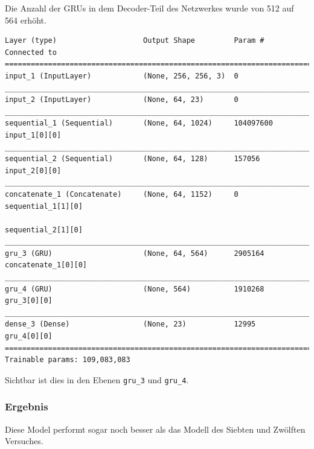 \documentclass[pdftex,a4paper,halfparskip, article]{scrartcl}
\begin{document}
Die Anzahl der GRUs in dem Decoder-Teil des Netzwerkes wurde von 512 auf 564 erhöht. 

\begin{verbatim}
Layer (type)                    Output Shape         Param #     Connected to
=============================================================================
input_1 (InputLayer)            (None, 256, 256, 3)  0
_____________________________________________________________________________
input_2 (InputLayer)            (None, 64, 23)       0
_____________________________________________________________________________
sequential_1 (Sequential)       (None, 64, 1024)     104097600   input_1[0][0]
_____________________________________________________________________________
sequential_2 (Sequential)       (None, 64, 128)      157056      input_2[0][0]
_____________________________________________________________________________
concatenate_1 (Concatenate)     (None, 64, 1152)     0           sequential_1[1][0]
                                                                 sequential_2[1][0]
_____________________________________________________________________________
gru_3 (GRU)                     (None, 64, 564)      2905164     concatenate_1[0][0]
_____________________________________________________________________________
gru_4 (GRU)                     (None, 564)          1910268     gru_3[0][0]
_____________________________________________________________________________
dense_3 (Dense)                 (None, 23)           12995       gru_4[0][0]
=============================================================================
Trainable params: 109,083,083

\end{verbatim}

Sichtbar ist dies in den Ebenen \texttt{gru\_3} und \texttt{gru\_4}.

\subsubsection*{Ergebnis}

Diese Model performt sogar noch besser als das Modell des Siebten und Zwölften Versuches.
\end{document}
